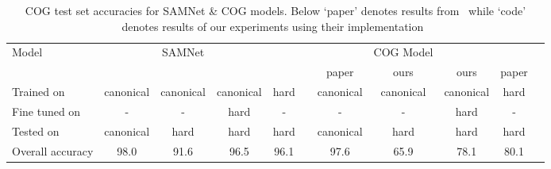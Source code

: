 \begin{table*}[htb]
	\caption{COG test set accuracies for SAMNet \& COG models. Below `paper' denotes results from~\cite{yang2018dataset} 
		while `code' denotes results of our experiments using their implementation~\cite{yang2018implement}}
	\centering
	\begin{adjustbox}{width=\textwidth}
		\begin{tabular}{lcccccccccc}
			\toprule
			Model & & SAMNet & && && COG Model&& \\
			\cmidrule{2-5} \cmidrule{7-11} 
			&&&&& & paper & ours & ours & paper&\\
			\cmidrule{7-9} \cmidrule{10-11}
			Trained on       & canonical & canonical & canonical & hard &           &  canonical  & canonical  & canonical & hard \\ 
			Fine tuned on  & - & - & hard  & - &           & -   & - & hard & - \\ 
			Tested on        & canonical & hard & hard & hard &            &canonical  & hard & hard & hard  \\ 
			\midrule
			
			Overall accuracy & 98.0 & 91.6 & 96.5  & 96.1 &           & 97.6  & 65.9 & 78.1& 80.1 \\ 
			
			\midrule 
			

\end{tabular}
\end{adjustbox}
\end{table*}
